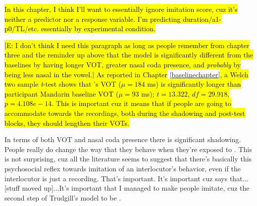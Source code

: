 

    
    
    \hl{In this chapter, I think I'll want to essentially ignore imitation score, cuz it's neither a predictor nor a response variable. I'm predicting duration/a1-p0/TL/etc. essentially by experimental condition.}
    
    
    \hl{[E: I don't think I need this paragraph as long as people remember from chapter three and the reminder up above that the model is significantly different from the baselines by having longer VOT, greater nasal coda presence, and \emph{probably} by being less nasal in the vowel.] As reported in Chapter }\ref{baselinechapter}\hl{, a Welch two sample \textit{t}-test shows that \annie{}'s VOT ($\mu = 184$ ms) is significantly longer than participant Mandarin baseline VOT ($\mu = 93$ ms); $t = 13.322$, $df = 29.918$, $p = 4.108e-14$. This is important cuz it means that if people are going to accommodate towards the recordings, both during the shadowing and post-test blocks, they should lengthen their VOTs.}
    
    In terms of both VOT and nasal coda presence there is significant shadowing. People really do change the way that they behave when they're exposed to \annie{}. This is not surprising, cuz all the literature seems to suggest that there's basically this psychosocial reflex towards imitation of an interlocutor's behavior, even if the interlocutor is just a recording. That's important. It's important cuz \cite{trudgill1986dialects} says that...[stuff moved up]...It's important that I managed to make people imitate, cuz  the second step of Trudgill's model to be .
    
